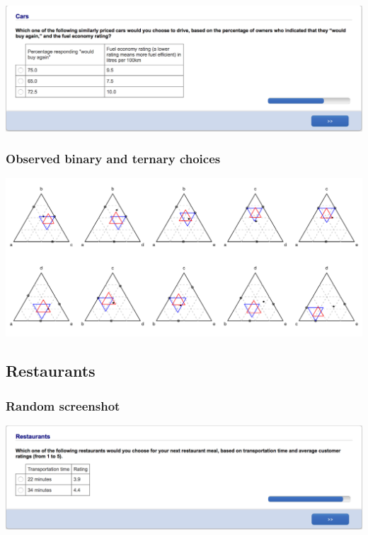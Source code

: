 \documentclass[11pt,letter]{article}
\begin{document}
\includegraphics[width=15cm]{Population_study_design/screenshot_cars.png}

\subsubsection*{Observed binary and ternary choices}

\includegraphics[width=15cm]{./Population_study_data/Simplexes/cars.pdf}

\pagebreak

\subsection*{Restaurants}



\subsubsection*{Random screenshot}

\includegraphics[width=15cm]{Population_study_design/screenshot_restaurants.png}
\end{document}
